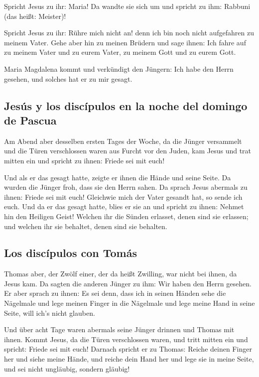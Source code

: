  Spricht Jesus zu ihr: Maria! Da wandte sie sich um und
spricht zu ihm: Rabbuni (das heißt: Meister)!

 Spricht Jesus zu ihr: Rühre mich nicht an! denn ich bin
noch nicht aufgefahren zu meinem Vater. Gehe aber hin zu meinen Brüdern
und sage ihnen: Ich fahre auf zu meinem Vater und zu eurem Vater, zu
meinem Gott und zu eurem Gott.

 Maria Magdalena kommt und verkündigt den Jüngern: Ich
habe den Herrn gesehen, und solches hat er zu mir gesagt.

\hypertarget{jesuxfas-y-los-discuxedpulos-en-la-noche-del-domingo-de-pascua}{%
\subsection{Jesús y los discípulos en la noche del domingo de
Pascua}\label{jesuxfas-y-los-discuxedpulos-en-la-noche-del-domingo-de-pascua}}

 Am Abend aber desselben ersten Tages der Woche, da die
Jünger versammelt und die Türen verschlossen waren aus Furcht vor den
Juden, kam Jesus und trat mitten ein und spricht zu ihnen: Friede sei
mit euch!

 Und als er das gesagt hatte, zeigte er ihnen die Hände
und seine Seite. Da wurden die Jünger froh, dass sie den Herrn sahen.
 Da sprach Jesus abermals zu ihnen: Friede sei mit euch!
Gleichwie mich der Vater gesandt hat, so sende ich euch. 
Und da er das gesagt hatte, blies er sie an und spricht zu ihnen: Nehmet
hin den Heiligen Geist!  Welchen ihr die Sünden erlasset,
denen sind sie erlassen; und welchen ihr sie behaltet, denen sind sie
behalten.

\hypertarget{los-discuxedpulos-con-tomuxe1s}{%
\subsection{Los discípulos con
Tomás}\label{los-discuxedpulos-con-tomuxe1s}}

 Thomas aber, der Zwölf einer, der da heißt Zwilling, war
nicht bei ihnen, da Jesus kam.  Da sagten die anderen
Jünger zu ihm: Wir haben den Herrn gesehen. Er aber sprach zu ihnen: Es
sei denn, dass ich in seinen Händen sehe die Nägelmale und lege meinen
Finger in die Nägelmale und lege meine Hand in seine Seite, will ich's
nicht glauben.

 Und über acht Tage waren abermals seine Jünger drinnen
und Thomas mit ihnen. Kommt Jesus, da die Türen verschlossen waren, und
tritt mitten ein und spricht: Friede sei mit euch! 
Darnach spricht er zu Thomas: Reiche deinen Finger her und siehe meine
Hände, und reiche dein Hand her und lege sie in meine Seite, und sei
nicht ungläubig, sondern gläubig!

